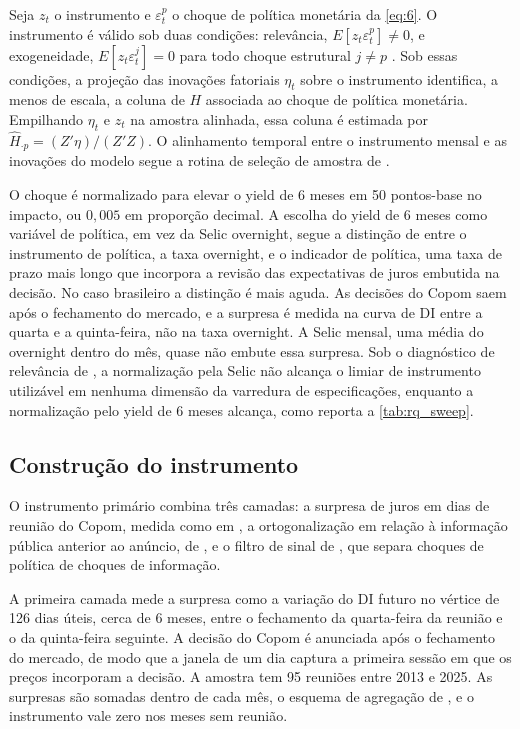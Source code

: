 \documentclass[
article,			%
12pt,				%
oneside,			%
a4paper,			%
hidelinks, 
english,			%
brazil,				%
]{abntex2}
\theoremstyle{plain}
\theoremstyle{definition}
\theoremstyle{remark}
\begin{document}
Seja $z_t$ o instrumento e $\varepsilon_t^{p}$ o choque de política monetária da \cref{eq:6}. O instrumento é válido sob duas condições: relevância, $E[z_t \varepsilon_t^{p}] \neq 0$, e exogeneidade, $E[z_t \varepsilon_t^{j}] = 0$ para todo choque estrutural $j \neq p$ \cite{stockwatson2018}. Sob essas condições, a projeção das inovações fatoriais $\eta_t$ sobre o instrumento identifica, a menos de escala, a coluna de $H$ associada ao choque de política monetária. Empilhando $\eta_t$ e $z_t$ na amostra alinhada, essa coluna é estimada por $\hat{H}_{\cdot p} = (Z'\eta)/(Z'Z)$. O alinhamento temporal entre o instrumento mensal e as inovações do modelo segue a rotina de seleção de amostra de .

O choque é normalizado para elevar o yield de 6 meses em 50 pontos-base no impacto, ou $0{,}005$ em proporção decimal. A escolha do yield de 6 meses como variável de política, em vez da Selic overnight, segue a distinção de  entre o instrumento de política, a taxa overnight, e o indicador de política, uma taxa de prazo mais longo que incorpora a revisão das expectativas de juros embutida na decisão. No caso brasileiro a distinção é mais aguda. As decisões do Copom saem após o fechamento do mercado, e a surpresa é medida na curva de DI entre a quarta e a quinta-feira, não na taxa overnight. A Selic mensal, uma média do overnight dentro do mês, quase não embute essa surpresa. Sob o diagnóstico de relevância de , a normalização pela Selic não alcança o limiar de instrumento utilizável em nenhuma dimensão da varredura de especificações, enquanto a normalização pelo yield de 6 meses alcança, como reporta a \autoref{tab:rq_sweep}.

\subsection{Construção do instrumento}

O instrumento primário combina três camadas: a surpresa de juros em dias de reunião do Copom, medida como em , a ortogonalização em relação à informação pública anterior ao anúncio, de , e o filtro de sinal de , que separa choques de política de choques de informação.

A primeira camada mede a surpresa como a variação do DI futuro no vértice de 126 dias úteis, cerca de 6 meses, entre o fechamento da quarta-feira da reunião e o da quinta-feira seguinte. A decisão do Copom é anunciada após o fechamento do mercado, de modo que a janela de um dia captura a primeira sessão em que os preços incorporam a decisão. A amostra tem 95 reuniões entre 2013 e 2025. As surpresas são somadas dentro de cada mês, o esquema de agregação de , e o instrumento vale zero nos meses sem reunião.
\end{document}
